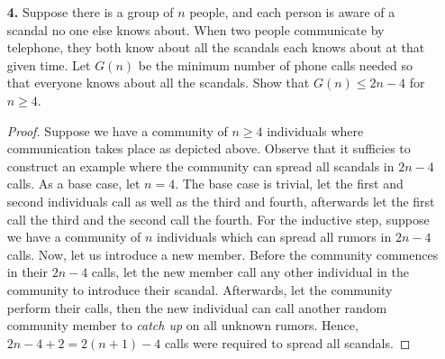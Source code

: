 \documentclass[ 12pt ]{article}
\begin{document}
\begin{enumerate}
		\begin{proof}
			\begin{enumerate}
				\item[\textbf{i.}] As a base case, let $n=1$. Clearly, no subsets of cardinality two can be created; thus, $0 = \frac{1(1-1)}{2}$ subsets exist. For the inductive step,
					assume we have a set $A$ consisting of $n$ elements with exactly $\frac{n(n-1)}{2}$ subsets of length two. Let us now append a unique element $k$ to create a set
					$A \cup \{ k \}$ of cardinality $n+1$. To calculate the new number of subsets with length two, we can see that all previous subsets still remain; additionally, all
					subsets with $k$ must also be included. Hence, $$|A \cup \{ k \}| = \frac{n(n-1)}{2} + \binom{n}{1} = \frac{n(n+1)}{2}.$$
				\item[\textbf{ii.}] As a base case, let $n=2$. Clearly, no subsets of cardinality three can be created; thus, $0 = \frac{2(2-1)(2-2)}{6}$ subsets exist. For the
					inductive step, assume we have a set $A$ consisting of $n$ elements with exactly $\frac{n(n-1)(n-2)}{6}$ subsets of length three. Let us now append a unique element
					$k$ to create a set $A \cup \{ k \}$ of cardinality $n+1$. To calculate the new number of subsets with length three, we can see that all previous subsets still
					remain; additionally, all subsets with $k$ must also be included. Hence, $$|A \cup \{ k \}| = \frac{n(n-1)(n-2)}{6} + \binom{n}{2} = \frac{n(n-1)(n+1)}{6}.$$
			\end{enumerate}
		\end{proof}


	\item[\textbf{4.}] Suppose there is a group of $n$ people, and each person is aware of a scandal no one else knows about. When two people communicate by telephone, they both know
		about all the scandals each knows about at that given time. Let $G(n)$ be the minimum number of phone calls needed so that everyone knows about all the scandals.  Show that
		$G(n) \leq 2n-4$ for $n \geq 4$.

		\begin{proof}
			Suppose we have a community of $n \geq 4$ individuals where communication takes place as depicted above. Observe that it sufficies to construct an example where the
			community can spread all scandals in $2n-4$ calls. As a base case, let $n=4$. The base case is trivial, let the first and second individuals call as well as the third and
			fourth, afterwards let the first call the third and the second call the fourth. For the inductive step, suppose we have a community of $n$ individuals which can spread all
			rumors in $2n-4$ calls. Now, let us introduce a new member. Before the community commences in their $2n-4$ calls, let the new member call any other individual in the
			community to introduce their scandal. Afterwards, let the community perform their calls, then the new individual can call another random community member to \textit{catch
			up} on all unknown rumors. Hence, $2n-4+2 = 2(n+1)-4$ calls were required to spread all scandals.
		\end{proof}



\end{enumerate}
\end{document}
